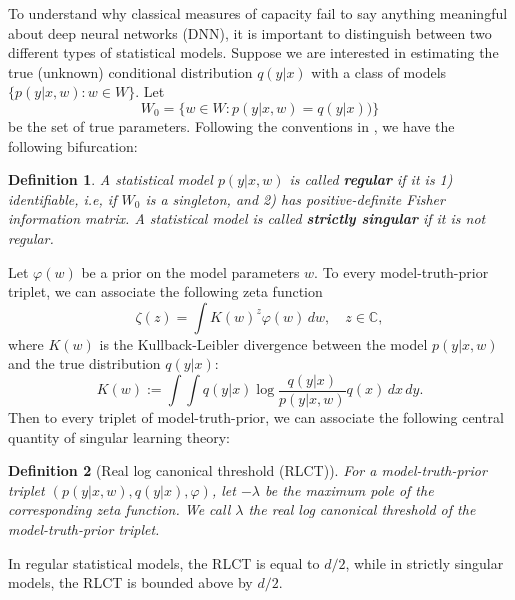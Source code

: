 \documentclass{article} %
\newtheorem{definition}{Definition}
\begin{document}
To understand why classical measures of capacity fail to say anything meaningful about deep neural networks (DNN), it is important to distinguish between two different types of statistical models. Suppose we are interested in estimating the true (unknown) conditional distribution $q(y|x)$ with a class of models $\{p(y|x,w): w \in W\}$. Let 
$$
W_0 = \{w \in W: p(y|x,w)=q(y|x))\}
$$
 be the set of true parameters.
Following the conventions in \cite{watanabe_algebraic_2009}, we have the following bifurcation:

\begin{definition}
A statistical model $p(y|x,w)$ is called \textbf{regular} if it is 1) identifiable, i.e, if $W_0$ is a singleton, and 2) has positive-definite Fisher information matrix. A statistical model is called \textbf{strictly singular} if it is not regular. 
\end{definition}


Let  $\varphi(w)$ be a prior on the model parameters $w$.
To every model-truth-prior triplet, we can associate the following zeta function
\begin{equation}
\zeta(z) = \int K(w)^z \varphi(w) \,dw, \quad z \in \mathbb C,
\end{equation} 
where $K(w)$ is the Kullback-Leibler divergence between the model $p(y|x,w)$ and the true distribution $q(y|x)$:
\begin{equation}
    K(w) := \int \!\int q(y|x) \log \frac{ q(y|x) }{ p(y|x,w) } q(x) \,dx \,dy.
\end{equation}
Then to every triplet of model-truth-prior, we can associate the following central quantity of singular learning theory:

\begin{definition}[Real log canonical threshold (RLCT)]
For a model-truth-prior triplet $(p(y|x,w),q(y|x),\varphi)$, let $-\lambda$ be the maximum pole of the corresponding zeta function. We call $\lambda$ the real log canonical threshold of the model-truth-prior triplet.
\label{def:RLCT}
\end{definition}
 
In regular statistical models, the RLCT is equal to $d/2$, while in strictly singular models, the RLCT is bounded above by $d/2$.
\end{document}

